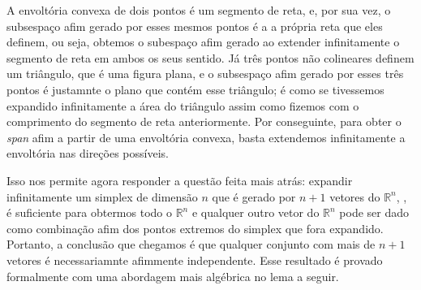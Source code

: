 A envoltória convexa de dois pontos é um segmento de reta, e,
por sua vez, o subsespaço afim gerado por esses mesmos pontos é a
a própria reta que eles definem, ou seja, obtemos o subespaço
afim gerado ao extender infinitamente o segmento de reta em
ambos os seus sentido. Já três pontos não colineares
definem um triângulo, que é uma figura plana, e o subsespaço afim gerado por
esses três pontos é justamnte o plano que contém esse triângulo; é como se
tivessemos expandido infinitamente a área do triângulo assim como fizemos
com o comprimento do segmento de reta anteriormente. Por conseguinte,
para obter o \textit{span} afim a partir de uma envoltória convexa, basta
extendemos infinitamente a envoltória nas direções possíveis.

Isso nos permite agora responder a questão feita mais atrás:
expandir infinitamente um simplex de dimensão $n$ que é gerado
por $n+1$ vetores do  $\mathbb{R}^n$,
, é suficiente para obtermos todo o $\mathbb{R}^n$
e qualquer outro vetor do $\mathbb{R}^n$ pode ser dado como
combinação afim dos pontos extremos do simplex que fora expandido.
Portanto, a conclusão que chegamos é que qualquer conjunto com mais
de $n+1$ vetores é necessariamnte afimmente independente. Esse resultado
é provado formalmente com uma abordagem mais algébrica no lema a seguir.

